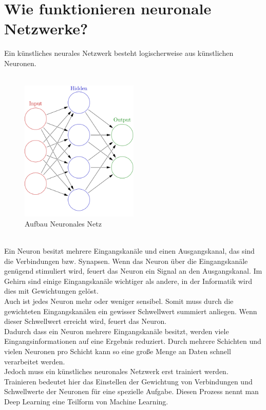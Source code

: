\documentclass[12pt,oneside,a4paper,parskip]{scrbook}
\begin{document}
\section{Wie funktionieren neuronale Netzwerke?}
Ein künstliches neurales Netzwerk besteht logischerweise aus künstlichen Neuronen.\\
\\
\begin{figure}
	\centering
	\includegraphics[width=0.5\textwidth]{neural_net}
	\caption{Aufbau Neuronales Netz}
\end{figure}
\\
Ein Neuron besitzt mehrere Eingangskanäle und einen Ausgangskanal, das sind die Verbindungen bzw. Synapsen. Wenn das Neuron über die Eingangskanäle genügend stimuliert wird, feuert das Neuron ein Signal an den Ausgangskanal. Im Gehirn sind einige Eingangskanäle wichtiger als andere, in der Informatik wird dies mit Gewichtungen gelöst. \\
Auch ist jedes Neuron mehr oder weniger sensibel. Somit muss durch die gewichteten Eingangskanälen ein gewisser Schwellwert summiert anliegen. Wenn dieser Schwellwert erreicht wird, feuert das Neuron.\\
Dadurch dass ein Neuron mehrere Eingangskanäle besitzt, werden viele Eingangsinformationen auf eine Ergebnis reduziert. Durch mehrere Schichten und vielen Neuronen pro Schicht kann so eine große Menge an Daten schnell verarbeitet werden. \\
Jedoch muss ein künstliches neuronales Netzwerk erst trainiert werden. Trainieren bedeutet hier das Einstellen der Gewichtung von Verbindungen und Schwellwerte der Neuronen für eine spezielle Aufgabe. Diesen Prozess nennt man Deep Learning eine Teilform von Machine Learning.
\end{document}
